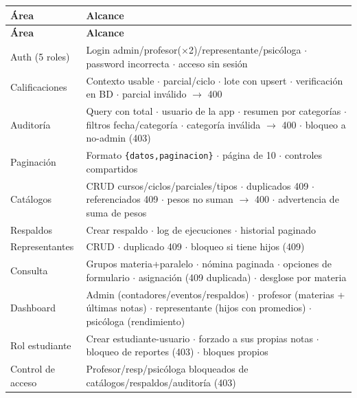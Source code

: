 \documentclass[11pt,a4paper]{article}
\begin{document}
{\small
\begin{longtable}{|p{}|p{}|}
\rowcolor{UTECblue}\color{white}\bfseries Área & \color{white}\bfseries Alcance \\ \hline
\endfirsthead
\rowcolor{UTECblue}\color{white}\bfseries Área & \color{white}\bfseries Alcance \\ \hline
\endhead
Auth (5 roles) & Login admin/profesor({$\times$}2)/representante/psicóloga {$\cdot$} password incorrecta {$\cdot$} acceso sin sesión \\ \hline
Calificaciones & Contexto usable {$\cdot$} parcial/ciclo {$\cdot$} lote con upsert {$\cdot$} verificación en BD {$\cdot$} parcial inválido {$\rightarrow$} 400 \\ \hline
Auditoría & Query con total {$\cdot$} usuario de la app {$\cdot$} resumen por categorías {$\cdot$} filtros fecha/categoría {$\cdot$} categoría inválida {$\rightarrow$} 400 {$\cdot$} bloqueo a no-admin (403) \\ \hline
Paginación & Formato \texttt{\{datos,paginacion\}} {$\cdot$} página de 10 {$\cdot$} controles compartidos \\ \hline
Catálogos & CRUD cursos/ciclos/parciales/tipos {$\cdot$} duplicados 409 {$\cdot$} referenciados 409 {$\cdot$} pesos no suman {$\rightarrow$} 400 {$\cdot$} advertencia de suma de pesos \\ \hline
Respaldos & Crear respaldo {$\cdot$} log de ejecuciones {$\cdot$} historial paginado \\ \hline
Representantes & CRUD {$\cdot$} duplicado 409 {$\cdot$} bloqueo si tiene hijos (409) \\ \hline
Consulta & Grupos materia+paralelo {$\cdot$} nómina paginada {$\cdot$} opciones de formulario {$\cdot$} asignación (409 duplicada) {$\cdot$} desglose por materia \\ \hline
Dashboard & Admin (contadores/eventos/respaldos) {$\cdot$} profesor (materias + últimas notas) {$\cdot$} representante (hijos con promedios) {$\cdot$} psicóloga (rendimiento) \\ \hline
Rol estudiante & Crear estudiante-usuario {$\cdot$} forzado a sus propias notas {$\cdot$} bloqueo de reportes (403) {$\cdot$} bloques propios \\ \hline
Control de acceso & Profesor/resp/psicóloga bloqueados de catálogos/respaldos/auditoría (403) \\ \hline
\end{longtable}}
\end{document}
